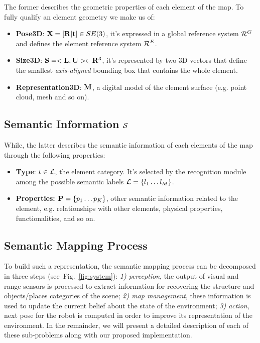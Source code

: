 \documentclass[letterpaper, 10 pt, conference]{ieeeconf}  %
\def\figref#1{Fig.~\ref{#1}}
\begin{document}
The former describes the geometric properties of each element of the map. To fully qualify an element geometry we make us of:
\begin{itemize}
	\item {\bf Pose3D}: $\mathbf{X} = [ \mathbf{R} | \mathbf{t}] \in SE(3)$, it's expressed in a global reference system $\mathcal{R}^G$ and defines the element reference system $\mathcal{R}^E$.
	\item {\bf Size3D}: $\mathbf{S} = <\mathbf{L} ,\mathbf{U}> \in \mathbf{R}^3 $, it's represented by two 3D vectors that define the smallest \emph{axis-aligned} bounding box that contains the whole element.
	\item {\bf Representation3D}: $\mathbf{M}$, a digital model of the element surface (e.g. point cloud, mesh and so on).
\end{itemize}

\subsection{Semantic Information $\mathcal{S}$}

While, the latter describes the semantic information of each elements of the map through the following properties:
\begin{itemize}
	\item {\bf Type}: $t \in \mathcal{L}$, the element category. It's selected by the recognition module among the possible semantic labels $\mathcal{L} = \{l_1 \dots l_M \}$.
	\item {\bf Properties:} $\mathbf{P} = \{ p_1 \dots p_K \}$, other semantic information related to the element, e.g. relationships with other elements, physical properties, functionalities, and so on. 
\end{itemize}   

\subsection{Semantic Mapping Process}

To build such a representation, the semantic mapping process can be decomposed in three steps (see~\figref{fig:system}): \emph{1) perception}, the output of visual and range sensors is processed to extract information for recovering the structure and objects/places categories of the scene; \emph{2) map management}, these information is used to update the current belief about the state of the environment; \emph{3) action}, next pose for the robot is computed in order to improve its representation of the environment. In the remainder, we will present a detailed description of each of these sub-problems along with our proposed implementation.
\end{document}
